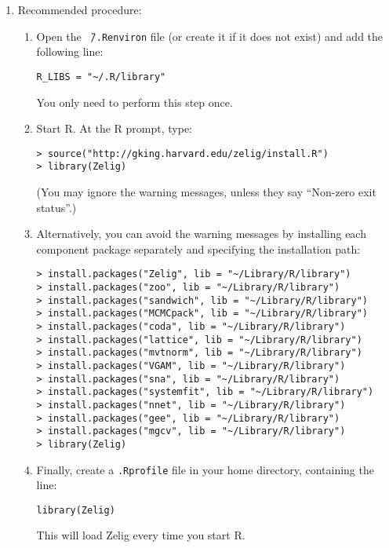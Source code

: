 \documentclass{article}
\begin{document}
\begin{enumerate}
\item Recommended procedure: 
  \begin{enumerate}
  \item Open the {\tt \~\,/.Renviron} file (or create it if it does
    not exist) and add the following line:
\begin{verbatim}
R_LIBS = "~/.R/library"
\end{verbatim}
    You only need to perform this step once.
  \item Start R.  At the R prompt, type:
\begin{verbatim}
> source("http://gking.harvard.edu/zelig/install.R")
> library(Zelig)
\end{verbatim}
(You may ignore the warning messages, unless they say ``Non-zero exit 
status''.)
\item Alternatively, you can avoid the warning messages by installing each 
component package separately and specifying the installation path:  
\begin{verbatim}
> install.packages("Zelig", lib = "~/Library/R/library")
> install.packages("zoo", lib = "~/Library/R/library")
> install.packages("sandwich", lib = "~/Library/R/library")
> install.packages("MCMCpack", lib = "~/Library/R/library")
> install.packages("coda", lib = "~/Library/R/library")
> install.packages("lattice", lib = "~/Library/R/library")
> install.packages("mvtnorm", lib = "~/Library/R/library")
> install.packages("VGAM", lib = "~/Library/R/library")
> install.packages("sna", lib = "~/Library/R/library")
> install.packages("systemfit", lib = "~/Library/R/library")
> install.packages("nnet", lib = "~/Library/R/library")
> install.packages("gee", lib = "~/Library/R/library")
> install.packages("mgcv", lib = "~/Library/R/library")
> library(Zelig)
\end{verbatim}
\item Finally, create a {\tt .Rprofile} file in your home directory, containing the line:
\begin{verbatim}
library(Zelig)
\end{verbatim}
This will load Zelig every time you start R.  
  \end{enumerate}  


\end{enumerate}
\end{document}

